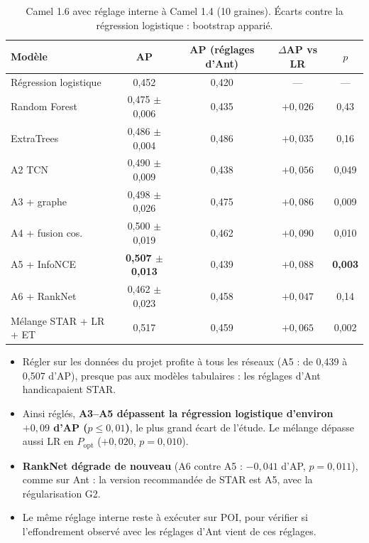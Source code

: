 \documentclass[11pt,a4paper,openany]{report}
\newcommand{\best}[1]{\textbf{\color{primary}#1}}
\begin{document}
\begin{table}[H]
\centering\small
\caption{Camel 1.6 avec réglage interne à Camel 1.4 (10 graines). Écarts contre la régression logistique : bootstrap
apparié.}
\label{tab:retune}
\begin{tabular}{lcccc}
\toprule
\textbf{Modèle} & \textbf{AP} & \textbf{AP (réglages d'Ant)} & \textbf{$\Delta$AP vs LR} & \textbf{$p$} \\
\midrule
Régression logistique   & 0,452              & 0,420 & ---         & ---   \\
Random Forest           & 0,475 $\pm$ 0,006 & 0,435 & $+0{,}026$ & 0,43  \\
ExtraTrees              & 0,486 $\pm$ 0,004 & 0,486 & $+0{,}035$ & 0,16  \\
A2 TCN                  & 0,490 $\pm$ 0,009 & 0,438 & $+0{,}056$ & 0,049 \\
A3 + graphe             & 0,498 $\pm$ 0,026 & 0,475 & $+0{,}086$ & 0,009 \\
A4 + fusion cos.        & 0,500 $\pm$ 0,019 & 0,462 & $+0{,}090$ & 0,010 \\
A5 + InfoNCE            & \best{0,507 $\pm$ 0,013} & 0,439 & \best{$+0{,}088$} & \best{0,003} \\
A6 + RankNet            & 0,462 $\pm$ 0,023 & 0,458 & $+0{,}047$ & 0,14  \\
Mélange STAR + LR + ET  & 0,517              & 0,459 & $+0{,}065$ & 0,002 \\
\bottomrule
\end{tabular}
\end{table}

\begin{keybox}[Lecture]
\begin{itemize}[leftmargin=1em]
  \item Régler sur les données du projet profite à tous les réseaux (A5 : de 0,439 à 0,507 d'AP), presque pas aux
        modèles tabulaires : les réglages d'Ant handicapaient STAR.
  \item Ainsi réglés, \textbf{A3--A5 dépassent la régression logistique d'environ $+0{,}09$ d'AP ($p\le0{,}01$)}, le
        plus grand écart de l'étude. Le mélange dépasse aussi LR en $P_{\mathrm{opt}}$ ($+0{,}020$, $p=0{,}010$).
  \item \textbf{RankNet dégrade de nouveau} (A6 contre A5 : $-0{,}041$ d'AP, $p=0{,}011$), comme sur Ant : la version
        recommandée de STAR est A5, avec la régularisation G2.
  \item Le même réglage interne reste à exécuter sur POI, pour vérifier si l'effondrement observé avec les réglages
        d'Ant vient de ces réglages.
\end{itemize}
\end{keybox}
\end{document}
